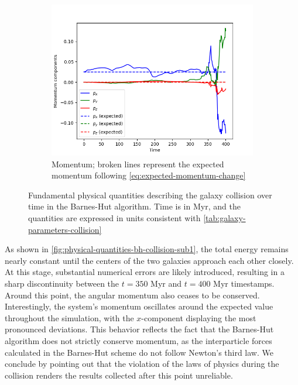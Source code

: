 \begin{figure}[!ht]
    \vspace{0.2cm}

    \begin{subfigure}[b]{0.45\textwidth}
        \centering
        \includegraphics[width=\textwidth]{chapters/results/img/bh-collision/momentum.png}
        \caption{Momentum; broken lines represent the expected momentum following \autoref{eq:expected-momentum-change}}
        \label{fig:physical-quantities-bh-collision-sub3}
    \end{subfigure}

    \caption{Fundamental physical quantities describing the galaxy collision over time in the Barnes-Hut algorithm.
        Time is in Myr, and the quantities are expressed in units consistent with \autoref{tab:galaxy-parameters-collision}}
    \label{fig:physical-quantities-bh-collision}
\end{figure}

As shown in \autoref{fig:physical-quantities-bh-collision-sub1}, the total energy remains nearly constant until the centers of the two galaxies approach each other closely. At this stage, substantial numerical errors are likely introduced, resulting in a sharp discontinuity between the $t = 350$ Myr and $t = 400$ Myr timestamps.
Around this point, the angular momentum also ceases to be conserved.
Interestingly, the system's momentum oscillates around the expected value throughout the simulation, with the $x$-component displaying the most pronounced deviations.
This behavior reflects the fact that the Barnes-Hut algorithm does not strictly conserve momentum, as the interparticle forces calculated in the Barnes-Hut scheme do not follow Newton's third law.
We conclude by pointing out that the violation of the laws of physics during the collision renders the results collected after this point unreliable.

